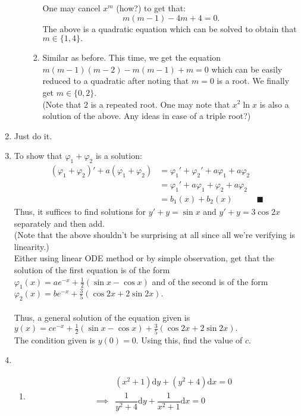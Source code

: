 \documentclass[12pt]{article}
\newcommand{\dd}{{\mathrm d}}
\begin{document}
\begin{enumerate}[label = Q.\arabic*.]
\begin{enumerate}[label = (\alph*)]
\begin{enumerate}[label = (\roman*)]
			One may cancel $x^m$ (how?) to get that:
			\[m(m - 1) - 4m + 4 = 0.\]
			The above is a quadratic equation which can be solved to obtain that $m \in \{1, 4\}.$
			\item Similar as before. This time, we get the equation $m(m - 1)(m - 2) - m(m - 1) + m = 0$ which can be easily reduced to a quadratic after noting that $m = 0$ is a root. We finally get $m \in \{0, 2\}.$ \\
			(Note that $2$ is a repeated root. One may note that $x^2\ln x$ is also a solution of the above. Any ideas in case of a triple root?)
		\end{enumerate}	
	\end{enumerate}
	\item Just do it. \checkmark
	\item To show that $\varphi_1 + \varphi_2$ is a solution:\\
	\begin{align*} 
		(\varphi_1 + \varphi_2)' + a(\varphi_1 + \varphi_2) &= \varphi_1' + \varphi_2' + a\varphi_1 + a\varphi_2\\
		&= \varphi_1' + a\varphi_1 + \varphi_2 + a\varphi_2\\
		&= b_1(x) + b_2(x) & \blacksquare
	\end{align*}
	Thus, it suffices to find solutions for $y' + y = \sin x$ and $y' + y = 3\cos 2x$ separately and then add.\\
	(Note that the above shouldn't be surprising at all since all we're verifying is linearity.)\\
	Either using linear ODE method or by simple observation, get that the solution of the first equation is of the form $\varphi_1(x) = ae^{-x} + \frac{1}{2}(\sin x - \cos x)$ and of the second is of the form $\varphi_2(x) = be^{-x} + \frac{3}{5}(\cos2x + 2\sin 2x).$\\~\\
	Thus, a general solution of the equation given is $y(x) = ce^{-x} + \frac{1}{2}(\sin x - \cos x) + \frac{3}{5}(\cos2x + 2\sin 2x).$\\
	The condition given is $y(0) = 0.$ Using this, find the value of $c.$
	\item 
	\begin{enumerate}[label = (\roman*)] 
		\item 
		\begin{align*} 
			& (x^2 + 1)\dd y + (y^2 + 4)\dd x = 0\\
			\implies & \dfrac{1}{y^2 + 4}\dd y + \dfrac{1}{x^2 + 1}\dd x = 0\\~\\

\end{align*}
\end{enumerate}
\end{enumerate}
\end{document}
